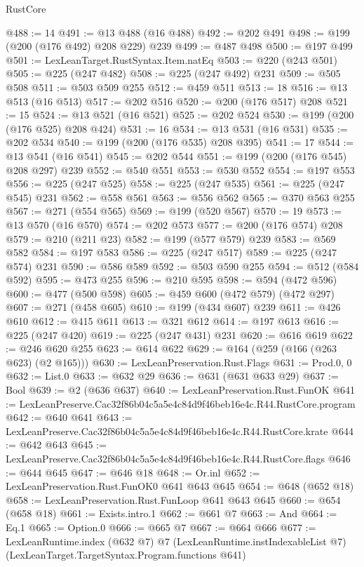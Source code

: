 \begin{lexlean}{RustCore}
\begin{coremodule}
@488 := 14
@491 := @13 @488 (@16 @488)
@492 := @202 @491
@498 := @199 (@200 (@176 @492) @208 @229) @239
@499 := @487 @498
@500 := @197 @499
@501 := LexLeanTarget.RustSyntax.Item.natEq
@503 := @220 (@243 @501)
@505 := @225 (@247 @482)
@508 := @225 (@247 @492) @231
@509 := @505 @508
@511 := @503 @509 @255
@512 := @459 @511
@513 := 18
@516 := @13 @513 (@16 @513)
@517 := @202 @516
@520 := @200 (@176 @517) @208
@521 := 15
@524 := @13 @521 (@16 @521)
@525 := @202 @524
@530 := @199 (@200 (@176 @525) @208 @424)
@531 := 16
@534 := @13 @531 (@16 @531)
@535 := @202 @534
@540 := @199 (@200 (@176 @535) @208 @395)
@541 := 17
@544 := @13 @541 (@16 @541)
@545 := @202 @544
@551 := @199 (@200 (@176 @545) @208 @297) @239
@552 := @540 @551
@553 := @530 @552
@554 := @197 @553
@556 := @225 (@247 @525)
@558 := @225 (@247 @535)
@561 := @225 (@247 @545) @231
@562 := @558 @561
@563 := @556 @562
@565 := @370 @563 @255
@567 := @271 (@554 @565)
@569 := @199 (@520 @567)
@570 := 19
@573 := @13 @570 (@16 @570)
@574 := @202 @573
@577 := @200 (@176 @574) @208
@579 := @210 (@211 @23)
@582 := @199 (@577 @579) @239
@583 := @569 @582
@584 := @197 @583
@586 := @225 (@247 @517)
@589 := @225 (@247 @574) @231
@590 := @586 @589
@592 := @503 @590 @255
@594 := @512 (@584 @592)
@595 := @473 @255
@596 := @210 @595
@598 := @594 (@472 @596)
@600 := @477 (@500 @598)
@605 := @459 @600 (@472 @579) (@472 @297)
@607 := @271 (@458 @605)
@610 := @199 (@434 @607) @239
@611 := @426 @610
@612 := @415 @611
@613 := @321 @612
@614 := @197 @613
@616 := @225 (@247 @420)
@619 := @225 (@247 @431) @231
@620 := @616 @619
@622 := @246 @620 @255
@623 := @614 @622
@629 := @164 (@259 (@166 (@263 @623) (@2 @165)))
@630 := LexLeanPreservation.Rust.Flags
@631 := Prod.{0, 0}
@632 := List.{0}
@633 := @632 @29
@636 := @631 (@631 @633 @29)
@637 := Bool
@639 := @2 (@636 @637)
@640 := LexLeanPreservation.Rust.FunOK
@641 := LexLeanPreserve.Cac32f86b04c5a5e4c84d9f46beb16e4c.R44.RustCore.program
@642 := @640 @641
@643 := LexLeanPreserve.Cac32f86b04c5a5e4c84d9f46beb16e4c.R44.RustCore.krate
@644 := @642 @643
@645 := LexLeanPreserve.Cac32f86b04c5a5e4c84d9f46beb16e4c.R44.RustCore.flags
@646 := @644 @645
@647 := @646 @18
@648 := Or.inl
@652 := LexLeanPreservation.Rust.FunOK0 @641 @643 @645
@654 := @648 (@652 @18)
@658 := LexLeanPreservation.Rust.FunLoop @641 @643 @645
@660 := @654 (@658 @18)
@661 := Exists.intro.{1}
@662 := @661 @7
@663 := And
@664 := Eq.{1}
@665 := Option.{0}
@666 := @665 @7
@667 := @664 @666
@677 := LexLeanRuntime.index
    (@632 @7)
    @7
    (LexLeanRuntime.instIndexableList @7)
    (LexLeanTarget.TargetSyntax.Program.functions @641)

\end{coremodule}
\end{lexlean}

